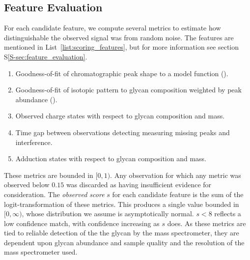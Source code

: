 \subsection{Feature Evaluation}
        For each candidate feature, we compute several metrics to estimate
    how distinguishable the observed signal was from random noise. The
    features are mentioned in List~\ref{list:scoring_features}, but for more
    information see section S\ref{S-sec:feature_evaluation}.

    \begin{ordlist}
    \begin{enumerate}
        \caption{Chromatographic Feature Metrics\label{list:scoring_features}}
        \item Goodness-of-fit of chromatographic peak shape to a model function
              (\cite{Yu2010,Kronewitter2014,}).
        \item Goodness-of-fit of isotopic pattern to glycan composition weighted
              by peak abundance (\cite{Maxwell2012}).
        \item Observed charge states with respect to glycan composition and mass.
        \item Time gap between  observations detecting measuring missing peaks
              and interference.
        \item Adduction states with respect to glycan composition and mass.
    \end{enumerate}
    \end{ordlist}

        These metrics are bounded in $[0, 1)$. Any observation for which any metric
    was observed below $0.15$ was discarded as having insufficient evidence for
    consideration. The \textit{observed score} $s$ for each candidate feature is
    the sum of the logit-transformation of these metrics. This produces a single
    value bounded in $[0, \infty)$, whose distribution we assume is asymptotically
    normal. $s < 8$ reflects a low confidence match, with confidence increasing
    as $s$ does. As these metrics are tied to reliable detection of the the glycan
    by the mass spectrometer, they are dependent upon glycan abundance and sample
    quality and the resolution of the mass spectrometer used.
